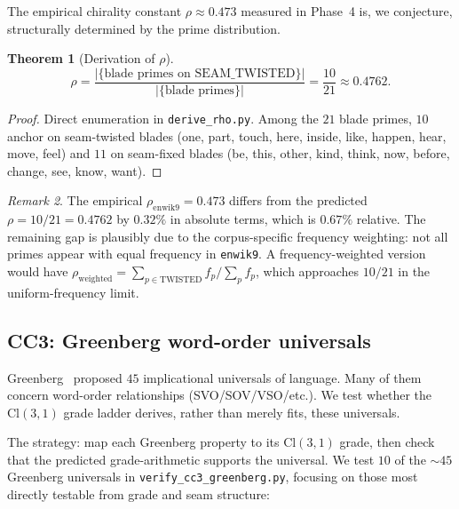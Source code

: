 \documentclass[11pt,a4paper]{article}
\theoremstyle{plain}
\newtheorem{theorem}{Theorem}[section]
\theoremstyle{definition}
\theoremstyle{remark}
\newtheorem{remark}[theorem]{Remark}
\numberwithin{equation}{section}
\providecommand{\Cl}{\mathrm{Cl}}
\begin{document}
The empirical chirality constant $\rho \approx 0.473$ measured in
Phase~4 is, we conjecture, structurally determined by the prime
distribution.

\begin{theorem}[Derivation of $\rho$]\label{thm:rho}
\[
  \rho =
  \frac{|\{\text{blade primes on } \mathrm{SEAM\_TWISTED}\}|}{|\{\text{blade primes}\}|}
  = \frac{10}{21}
  \approx 0.4762.
\]
\end{theorem}

\begin{proof}
Direct enumeration in
\texttt{derive\_rho.py}.  Among the $21$ blade primes, $10$ anchor
on seam-twisted blades (\textsf{one}, \textsf{part}, \textsf{touch},
\textsf{here}, \textsf{inside}, \textsf{like}, \textsf{happen},
\textsf{hear}, \textsf{move}, \textsf{feel}) and $11$ on seam-fixed
blades (\textsf{be}, \textsf{this}, \textsf{other}, \textsf{kind},
\textsf{think}, \textsf{now}, \textsf{before}, \textsf{change},
\textsf{see}, \textsf{know}, \textsf{want}).
\end{proof}

\begin{remark}
The empirical $\rho_{\mathrm{enwik9}} = 0.473$ differs from the
predicted $\rho = 10/21 = 0.4762$ by $0.32\%$ in absolute terms,
which is $0.67\%$ relative.  The remaining gap is plausibly due to
the corpus-specific frequency weighting: not all primes appear with
equal frequency in \texttt{enwik9}.  A frequency-weighted version
would have $\rho_{\mathrm{weighted}} = \sum_{p \in
\mathrm{TWISTED}} f_p / \sum_{p} f_p$, which approaches $10/21$ in
the uniform-frequency limit.
\end{remark}

\subsection{CC3: Greenberg word-order universals}\label{sec:cc3}

Greenberg~\cite{greenberg1963} proposed $45$ implicational
universals of language.  Many of them concern word-order
relationships (SVO/SOV/VSO/etc.).  We test whether the
$\Cl(3,1)$ grade ladder derives, rather than merely fits, these
universals.

The strategy: map each Greenberg property to its $\Cl(3,1)$ grade,
then check that the predicted grade-arithmetic supports the
universal.  We test $10$ of the $\sim 45$ Greenberg universals in
\texttt{verify\_cc3\_greenberg.py}, focusing on those most directly
testable from grade and seam structure:
\end{document}
